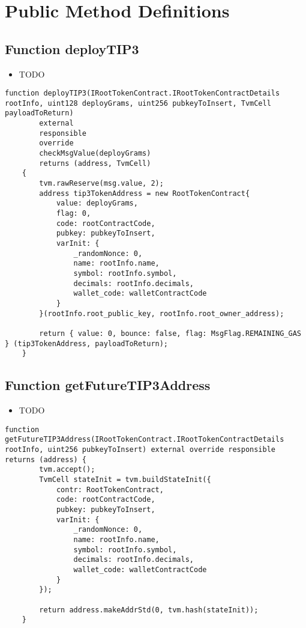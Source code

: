 \section{Public Method Definitions}


\subsection{Function deployTIP3}

\noindent\begin{itemize}
\item TODO
\end{itemize}

\begin{lstlisting}[firstnumber=66]
    function deployTIP3(IRootTokenContract.IRootTokenContractDetails rootInfo, uint128 deployGrams, uint256 pubkeyToInsert, TvmCell payloadToReturn) 
        external
        responsible
        override
        checkMsgValue(deployGrams)
        returns (address, TvmCell) 
    {
        tvm.rawReserve(msg.value, 2);
        address tip3TokenAddress = new RootTokenContract{
            value: deployGrams,
            flag: 0,
            code: rootContractCode,
            pubkey: pubkeyToInsert,
            varInit: {
                _randomNonce: 0,
                name: rootInfo.name,
                symbol: rootInfo.symbol,
                decimals: rootInfo.decimals,
                wallet_code: walletContractCode 
            }
        }(rootInfo.root_public_key, rootInfo.root_owner_address);

        return { value: 0, bounce: false, flag: MsgFlag.REMAINING_GAS } (tip3TokenAddress, payloadToReturn);
    }
\end{lstlisting}

\subsection{Function getFutureTIP3Address}

\noindent\begin{itemize}
\item TODO
\end{itemize}

\begin{lstlisting}[firstnumber=95]
    function getFutureTIP3Address(IRootTokenContract.IRootTokenContractDetails rootInfo, uint256 pubkeyToInsert) external override responsible returns (address) {
        tvm.accept();
        TvmCell stateInit = tvm.buildStateInit({
            contr: RootTokenContract,
            code: rootContractCode,
            pubkey: pubkeyToInsert,
            varInit: {
                _randomNonce: 0,
                name: rootInfo.name,
                symbol: rootInfo.symbol,
                decimals: rootInfo.decimals,
                wallet_code: walletContractCode 
            }
        });

        return address.makeAddrStd(0, tvm.hash(stateInit));
    }
\end{lstlisting}


